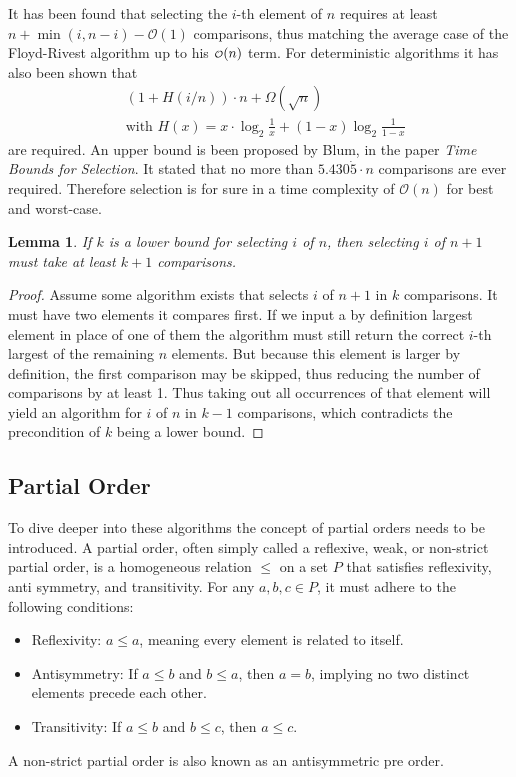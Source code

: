 \documentclass[10pt,journal,compsoc]{IEEEtran}
\newcommand\smallO{
  \mathchoice
    {{\scriptstyle\mathcal{O}}}%
    {{\scriptstyle\mathcal{O}}}%
    {{\scriptscriptstyle\mathcal{O}}}%
    {\scalebox{.50}{$\scriptscriptstyle\mathcal{O}$}}%
  }
\newtheorem{lemma}{Lemma}
\begin{document}
It has been found that selecting the $i$-th element of $n$ requires at least
$n+\min(i,n-i)-\mathcal{O}(1)$ comparisons, thus matching the average case of the Floyd-Rivest
algorithm up to his $\smallO(n)$ term. For deterministic algorithms it has also been shown that
\begin{eqnarray*}
  &\left (1 + H(i/n) \right ) \cdot n + \Omega(\sqrt n) \\
  &\text{with~} H(x) = x \cdot \log_2 \frac{1}{x} + (1-x) \log_2 \frac{1}{1-x}
\end{eqnarray*}
are required. An upper bound is been proposed by Blum, in the paper \textit{Time Bounds for
  Selection}. It stated that no more than $5.430\dot{5} \cdot n$ comparisons are ever required.
Therefore selection is for sure in a time complexity of $\mathcal{O}(n)$ for best and worst-case.

\begin{lemma}
  If $k$ is a lower bound for selecting $i$ of $n$, then selecting $i$ of $n+1$ must take at least $k+1$ comparisons.
\end{lemma}

\begin{proof}
  Assume some algorithm exists that selects $i$ of $n+1$ in $k$ comparisons. It must have two elements it compares first.
  If we input a by definition largest element in place of one of them the algorithm must still return the correct $i$-th
  largest of the remaining $n$ elements. But because this element is larger by definition, the first comparison may be
  skipped, thus reducing the number of comparisons by at least 1. Thus taking out all occurrences of that element will
  yield an algorithm for $i$ of $n$ in $k-1$ comparisons, which contradicts the precondition of $k$ being a lower bound.
\end{proof}


\subsection{Partial Order}
\label{sec:partial_order}
To dive deeper into these algorithms the concept of partial orders needs to be introduced. A partial
order, often simply called a reflexive, weak, or non-strict partial order, is a homogeneous relation
$\leq$ on a set $P$ that satisfies reflexivity, anti symmetry, and transitivity. For any $a, b, c
  \in P$, it must adhere to the following conditions:

\begin{itemize}
  \item Reflexivity: $a \leq a$, meaning every element is related to itself.
  \item Antisymmetry: If $a \leq b$ and $b \leq a$, then $a = b$, implying no two distinct elements
        precede each other.
  \item Transitivity: If $a \leq b$ and $b \leq c$, then $a \leq c$.
\end{itemize}
A non-strict
partial order is also known as an antisymmetric pre order.
\end{document}
